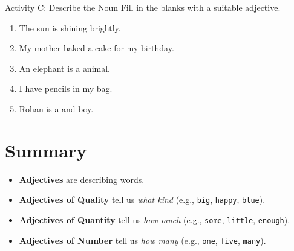\begin{activitybox}{Activity C: Describe the Noun}
Fill in the blanks with a suitable adjective.
\begin{enumerate}
    \item The \underline{\hspace{2cm}} sun is shining brightly.
    \item My mother baked a \underline{\hspace{2cm}} cake for my birthday.
    \item An elephant is a \underline{\hspace{2cm}} animal.
    \item I have \underline{\hspace{2cm}} pencils in my bag.
    \item Rohan is a \underline{\hspace{2cm}} and \underline{\hspace{2cm}} boy.
\end{enumerate}
\end{activitybox}

\section{Summary}
\begin{summarybox}
    \begin{itemize}
        \item \textbf{Adjectives} are describing words.
        \item \textbf{Adjectives of Quality} tell us \textit{what kind} (e.g., \texttt{big}, \texttt{happy}, \texttt{blue}).
        \item \textbf{Adjectives of Quantity} tell us \textit{how much} (e.g., \texttt{some}, \texttt{little}, \texttt{enough}).
        \item \textbf{Adjectives of Number} tell us \textit{how many} (e.g., \texttt{one}, \texttt{five}, \texttt{many}).
    \end{itemize}
\end{summarybox}
